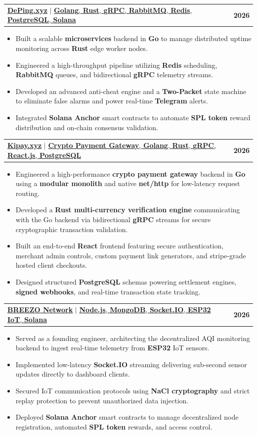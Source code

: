 \documentclass[letterpaper,11pt]{article}
\makeatletter
\newcommand{\resumeItem}[1]{\item\small{{#1 \vspace{-2pt}}}}
\newcommand{\resumeProjectHeading}[2]{
  \item
  \begin{tabular*}{1.001\textwidth}{l@{\extracolsep{\fill}}r}
    \small #1 & \textbf{\small #2} \\
  \end{tabular*}\vspace{-6pt}
}
\newcommand{\resumeItemListStart}{\begin{itemize}\vspace{-2pt}}
\newcommand{\resumeItemListEnd}{\end{itemize}\vspace{-5pt}}
\makeatother
\begin{document}
\resumeProjectHeading
{\href{https://deping.xyz}{\textbf{\large{\underline{DePing.xyz}}}} $|$
\large{\underline{\textbf{Golang}, \textbf{Rust}, \textbf{gRPC}, \textbf{RabbitMQ}, \textbf{Redis}, \textbf{PostgreSQL}, \textbf{Solana}}}}{2026}
\resumeItemListStart
\resumeItem{Built a scalable \textbf{microservices} backend in \textbf{Go} to manage distributed uptime monitoring across \textbf{Rust} edge worker nodes.}
\resumeItem{Engineered a high-throughput pipeline utilizing \textbf{Redis} scheduling, \textbf{RabbitMQ} queues, and bidirectional \textbf{gRPC} telemetry streams.}
\resumeItem{Developed an advanced anti-cheat engine and a \textbf{Two-Packet} state machine to eliminate false alarms and power real-time \textbf{Telegram} alerts.}
\resumeItem{Integrated \textbf{Solana Anchor} smart contracts to automate \textbf{SPL token} reward distribution and on-chain consensus validation.}
\resumeItemListEnd

\resumeProjectHeading
{\href{https://kipay.xyz}{\textbf{\large{\underline{Kipay.xyz}}}} $|$
\large{\underline{\textbf{Crypto Payment Gateway}, \textbf{Golang}, \textbf{Rust}, \textbf{gRPC}, \textbf{React.js}, \textbf{PostgreSQL}}}}{2026}
\resumeItemListStart
\resumeItem{Engineered a high-performance \textbf{crypto payment gateway} backend in \textbf{Go} using a \textbf{modular monolith} and native \textbf{net/http} for low-latency request routing.}
\resumeItem{Developed a \textbf{Rust multi-currency verification engine} communicating with the Go backend via bidirectional \textbf{gRPC} streams for secure cryptographic transaction validation.}
\resumeItem{Built an end-to-end \textbf{React} frontend featuring secure authentication, merchant admin controls, custom payment link generators, and stripe-grade hosted client checkouts.}
\resumeItem{Designed structured \textbf{PostgreSQL} schemas powering settlement engines, \textbf{signed webhooks}, and real-time transaction state tracking.}
\resumeItemListEnd

\resumeProjectHeading
{\href{https://www.breezonetwork.xyz}{\textbf{\large{\underline{BREEZO Network}}}} $|$
\large{\underline{\textbf{Node.js}, \textbf{MongoDB}, \textbf{Socket.IO}, \textbf{ESP32 IoT}, \textbf{Solana}}}}{2026}
\resumeItemListStart
\resumeItem{Served as a founding engineer, architecting the decentralized AQI monitoring backend to ingest real-time telemetry from \textbf{ESP32} IoT sensors.}
\resumeItem{Implemented low-latency \textbf{Socket.IO} streaming delivering sub-second sensor updates directly to dashboard clients.}
\resumeItem{Secured IoT communication protocols using \textbf{NaCl cryptography} and strict replay protection to prevent unauthorized data injection.}
\resumeItem{Deployed \textbf{Solana Anchor} smart contracts to manage decentralized node registration, automated \textbf{SPL token} rewards, and access control.}
\resumeItemListEnd
\end{document}
